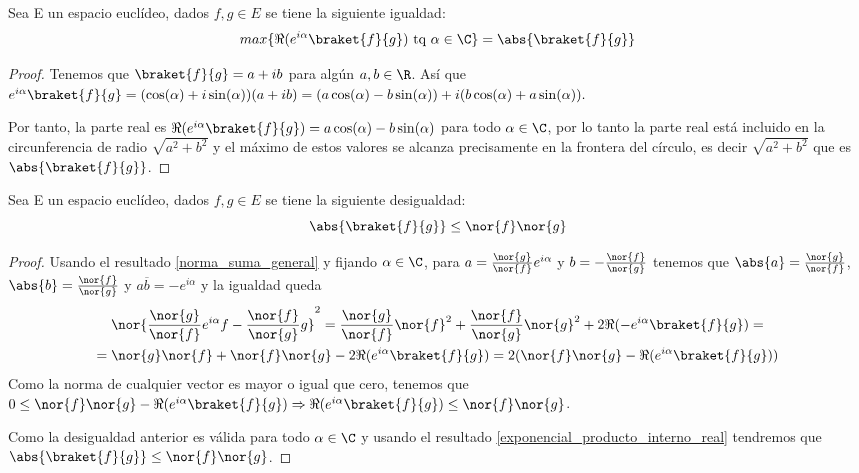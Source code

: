 \begin{resultado}
  \label{exponencial_producto_interno_real}
  Sea E un espacio euclídeo, dados $f,g\in E$ se tiene la siguiente igualdad:
  \begin{equation}
    max\{\Re(e^{i\alpha}\braket{f}{g})\text{ tq }\alpha\in\C\}=\abs{\braket{f}{g}}
  \end{equation}
\end{resultado}
\begin{proof}
  Tenemos que $\braket{f}{g}=a+ib$ para algún $a,b\in\R$. Así que $e^{i\alpha}\braket{f}{g}=(\cos(\alpha)+i \sin(\alpha))(a+ib)=(a \cos(\alpha)-b \sin(\alpha)) + i(b \cos(\alpha)+a\sin(\alpha)).$

  Por tanto, la parte real es $\Re(e^{i\alpha}\braket{f}{g})=a \cos(\alpha)-b \sin(\alpha)$ para todo $\alpha\in\C$, por lo tanto la parte real está incluido en la circunferencia de radio $\sqrt{a^2+b^2}$ y el máximo de estos valores se alcanza precisamente en la frontera del círculo, es decir $\sqrt{a^2+b^2}$ que es $\abs{\braket{f}{g}}$.
\end{proof}
\begin{resultado}
  \label{norma_producto_escalar_producto_norma}
  Sea E un espacio euclídeo, dados $f,g\in E$ se tiene la siguiente desigualdad:
  \begin{equation}
    \abs{\braket{f}{g}}\leq\nor{f}\nor{g}
  \end{equation}
\end{resultado}

\begin{proof}
  Usando el resultado \ref{norma_suma_general} y fijando $\alpha\in\C$, para $a=\frac{\nor{g}}{\nor{f}}e^{i\alpha}$ y $b=-\frac{\nor{f}}{\nor{g}}$ tenemos que $\abs{a}=\frac{\nor{g}}{\nor{f}}$, $\abs{b}=\frac{\nor{f}}{\nor{g}}$ y $a\overline{b}=-e^{i\alpha}$ y la igualdad queda
  \begin{multline*}
    \nor{\frac{\nor{g}}{\nor{f}}e^{i\alpha}f-\frac{\nor{f}}{\nor{g}}g}^2=\frac{\nor{g}}{\nor{f}}\nor{f}^2+\frac{\nor{f}}{\nor{g}}\nor{g}^2+2\Re(-e^{i\alpha}\braket{f}{g})=\\
    =\nor{g}\nor{f}+\nor{f}\nor{g}-2\Re(e^{i\alpha}\braket{f}{g})=2(\nor{f}\nor{g}-\Re(e^{i\alpha}\braket{f}{g}))
  \end{multline*}
  Como la norma de cualquier vector es mayor o igual que cero, tenemos que
  $0\leq\nor{f}\nor{g}-\Re(e^{i\alpha}\braket{f}{g})\Rightarrow \Re(e^{i\alpha}\braket{f}{g})\leq\nor{f}\nor{g}$.

  Como la desigualdad anterior es válida para todo $\alpha\in\C$ y usando el resultado \ref{exponencial_producto_interno_real} tendremos que $ \abs{\braket{f}{g}}\leq\nor{f}\nor{g}$.
\end{proof}

